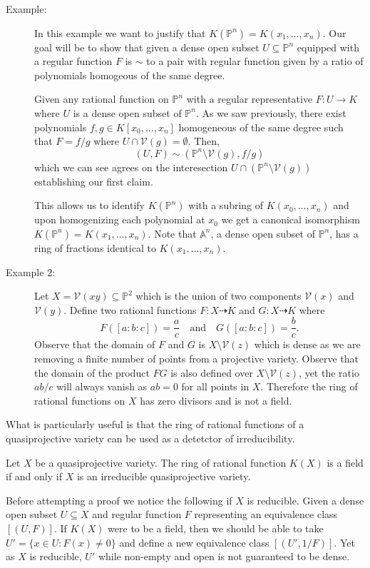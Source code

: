\documentclass[40pt]{article}
\newcommand{\Proj}{\mathbb{P}}
\newcommand{\A}{\mathbb{A}}
\newcommand{\V}{\mathcal{V}}
\newcommand{\todash}{\dashrightarrow}
\theoremstyle{remark}
\begin{document}
		\begin{description}
			\item[Example: ] In this example we want to justify that $K(\Proj^n) = K(x_1,\dots,x_n)$. Our goal will be to show that given a dense open subset $U\subseteq\Proj^n$ equipped with a regular function $F$ is $\sim$ to a pair with regular function given by a ratio of polynomials homogeous of the same degree.  
			
			Given any rational function on $\Proj^n$ with a regular representative $F : U \to K$ where $U$ is a dense open subset of $\Proj^n$. As we saw previously, there exist polynomials $f,g \in K[x_0,\dots,x_n]$ homogeneous of the same degree such that $F = f/g$ where $U \cap \V(g) = \emptyset$. Then, 
			\[
			(U, F) \sim (\Proj^n \setminus \V(g) , f/g)
			\]
			which we can see agrees on the interesection $U \cap (\Proj^n \setminus \V(g))$ establishing our first claim. 
			
			This allows us to identify $K(\Proj^n)$ with a subring of $K(x_0,\dots,x_n)$ and upon homogenizing each polynomial at $x_0$ we get a canonical isomorphism $K(\Proj^n) = K(x_1,\dots,x_n)$. Note that $\A^n$, a dense open subset of $\Proj^n$, has a ring of fractions identical to $K(x_1,\dots,x_n)$. 
			\item[Example 2:] Let $X = \V(xy) \subseteq \Proj^2$ which is the union of two components $\V(x)$ and $\V(y)$. Define two rational functions $F: X \todash K$ and $G: X \todash K$ where 
			\[
			F([a:b:c]) = \frac{a}{c} \quad\text{and}\quad G([a:b:c]) =\frac{b}{c}.
			\]
			Observe that the domain of $F$ and $G$ is $X \setminus \V(z)$ which is dense as we are removing a finite number of points from a projective variety. Observe that the domain of the product $FG$ is also defined over $X\setminus \V(z)$, yet the ratio $ab/c$ will always vanish as $ab = 0$ for all points in $X$. Therefore the ring of rational functions on $X$ has zero divisors and is not a field. 
		\end{description}
		What is particularly useful is that the ring of rational functions of a quasiprojective variety can be used as a detetctor of irreducibility.
		\begin{prop}
			Let $X$ be a quasiprojective variety. The ring of rational function $K(X)$ is a field if and only if $X$ is an irreducible quasiprojective variety. 
		\end{prop}
		Before attempting a proof we notice the following if $X$ is reducible. Given a dense open subset $U \subseteq X$ and regular function $F$ representing an equivalence class $[(U,F)]$. If $K(X)$ were to be a field, then we should be able to take $U' = \{x \in U : F(x) \neq 0\}$ and define a new equivalence class $[(U', 1/F)]$. Yet as $X$ is reducible, $U'$ while non-empty and open is not guaranteed to be dense. 
		
\end{document}
